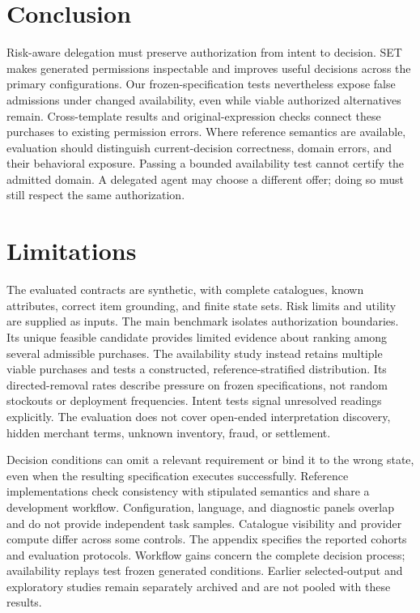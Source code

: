 \documentclass[11pt]{article}
\begin{document}
\section{Conclusion}
Risk-aware delegation must preserve authorization from intent to decision. SET makes generated permissions inspectable and improves useful decisions across the primary configurations. Our frozen-specification tests nevertheless expose false admissions under changed availability, even while viable authorized alternatives remain. Cross-template results and original-expression checks connect these purchases to existing permission errors. Where reference semantics are available, evaluation should distinguish current-decision correctness, domain errors, and their behavioral exposure. Passing a bounded availability test cannot certify the admitted domain. A delegated agent may choose a different offer; doing so must still respect the same authorization.
\label{mainend}

\section*{Limitations}
The evaluated contracts are synthetic, with complete catalogues, known attributes, correct item grounding, and finite state sets. Risk limits and utility are supplied as inputs. The main benchmark isolates authorization boundaries. Its unique feasible candidate provides limited evidence about ranking among several admissible purchases. The availability study instead retains multiple viable purchases and tests a constructed, reference-stratified distribution. Its directed-removal rates describe pressure on frozen specifications, not random stockouts or deployment frequencies. Intent tests signal unresolved readings explicitly. The evaluation does not cover open-ended interpretation discovery, hidden merchant terms, unknown inventory, fraud, or settlement.

Decision conditions can omit a relevant requirement or bind it to the wrong state, even when the resulting specification executes successfully. Reference implementations check consistency with stipulated semantics and share a development workflow. Configuration, language, and diagnostic panels overlap and do not provide independent task samples. Catalogue visibility and provider compute differ across some controls. The appendix specifies the reported cohorts and evaluation protocols. Workflow gains concern the complete decision process; availability replays test frozen generated conditions. Earlier selected-output and exploratory studies remain separately archived and are not pooled with these results.
\end{document}
